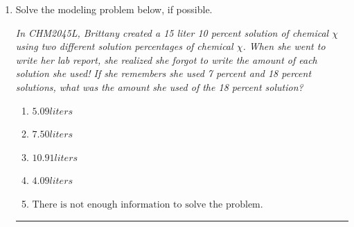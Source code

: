 \documentclass[14pt]{extbook}
\newcommand{\litem}[1]{\item#1\hspace*{-1cm}\rule{\textwidth}{0.4pt}}
\begin{document}
\begin{enumerate}
{\begin{enumerate}[label=\Alph*.]
\end{enumerate} }
\litem{
Solve the modeling problem below, if possible.
\begin{center}
    \textit{ In CHM2045L, Brittany created a 15 liter 10 percent solution of chemical $\chi$ using two different solution percentages of chemical $\chi$. When she went to write her lab report, she realized she forgot to write the amount of each solution she used! If she remembers she used 7 percent and 18 percent solutions, what was the amount she used of the 18 percent solution? }
\end{center}
\begin{enumerate}[label=\Alph*.]
\item \( 5.09 liters \)
\item \( 7.50 liters \)
\item \( 10.91 liters \)
\item \( 4.09 liters \)
\item \( \text{There is not enough information to solve the problem.} \)

\end{enumerate} }
\end{enumerate}
\end{document}
